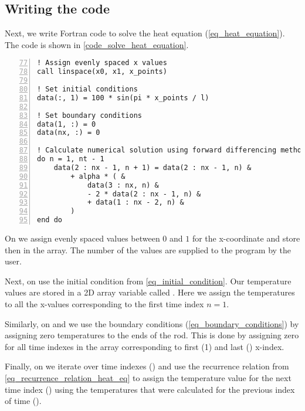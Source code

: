 \subsection{Writing the code}

Next, we write Fortran code to solve the heat equation (\autoref{eq_heat_equation}). The code is shown in \autoref{code_solve_heat_equation}.


\noindent\begin{minipage}{\linewidth}
\begin{lstlisting}[caption={Solving a heat equation with forward-difference method (\code{heat\_equation.f90}).},frame=tlrb,label={code_solve_heat_equation}, numbers=left, firstnumber=77]
! Assign evenly spaced x values
call linspace(x0, x1, x_points)

! Set initial conditions
data(:, 1) = 100 * sin(pi * x_points / l)

! Set boundary conditions
data(1, :) = 0
data(nx, :) = 0

! Calculate numerical solution using forward differencing method
do n = 1, nt - 1
    data(2 : nx - 1, n + 1) = data(2 : nx - 1, n) &
        + alpha * ( &
            data(3 : nx, n) &
            - 2 * data(2 : nx - 1, n) &
            + data(1 : nx - 2, n) &
        )
end do
\end{lstlisting}
\end{minipage}

On  we assign evenly spaced values between $0$ and $1$ for the x-coordinate and store then in the  array. The number of the values  are supplied to the program by the user.

Next, on  use the initial condition from \autoref{eq_initial_condition}. Our temperature values are stored in a 2D array variable called . Here we assign the temperatures to all the x-values corresponding to the first time index $n=1$.

Similarly, on  and  we use the boundary conditions (\autoref{eq_boundary_conditions}) by assigning zero temperatures to the ends of the rod. This is done by assigning zero for all time indexes in the  array corresponding to first (1) and last () x-index.

Finally, on  we iterate over time indexes () and use the recurrence relation from \autoref{eq_recurrence_relation_heat_eq} to assign the temperature value for the next time index () using the temperatures that were calculated for the previous index of time ().

